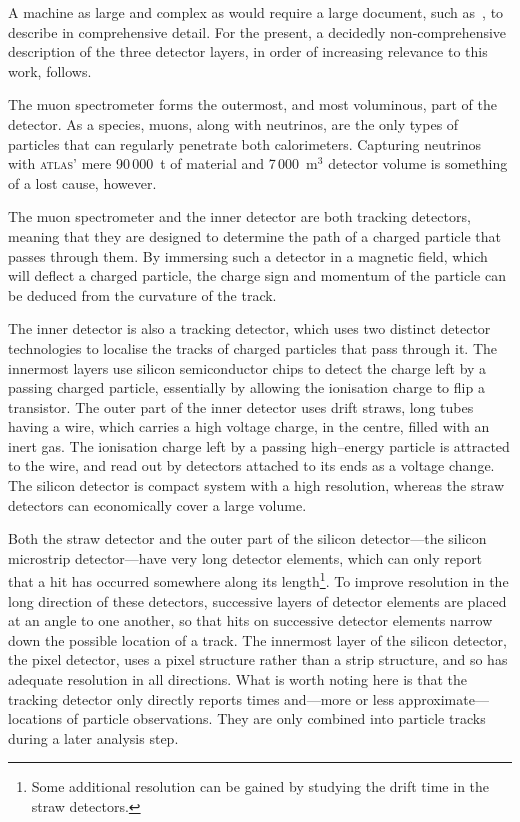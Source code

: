 A machine as large and complex as \atlas{} would require a large document, such as~\cite{detectorpaper}, to describe in comprehensive detail. For the present, a decidedly non-comprehensive description of the three detector layers, in order of increasing relevance to this work, follows.

The muon spectrometer forms the outermost, and most voluminous, part of the detector. As a species, muons, along with neutrinos, are the only types of particles that can regularly penetrate both calorimeters. Capturing neutrinos with \textsc{atlas}' mere 90\,000~t of material and 7\,000~m$^3$ detector volume \cite{atlasweb} is something of a lost cause, however.

The muon spectrometer and the inner detector are both tracking detectors, meaning that they are designed to determine the path of a charged particle that passes through them. By immersing such a detector in a magnetic field, which will deflect a charged particle, the charge sign and momentum of the particle can be deduced from the curvature of the track.

The inner detector is also a tracking detector, which uses two distinct detector technologies to localise the tracks of charged particles that pass through it. The innermost layers use silicon semiconductor chips to detect the charge left by a passing charged particle, essentially by allowing the ionisation charge to flip a transistor. The outer part of the inner detector uses drift straws, long tubes having a wire, which carries a high voltage charge, in the centre, filled with an inert gas. The ionisation charge left by a passing high--energy particle is attracted to the wire, and read out by detectors attached to its ends as a voltage change. The silicon detector is compact system with a high resolution, whereas the straw detectors can economically cover a large volume.

Both the straw detector and the outer part of the silicon detector---the silicon microstrip detector---have very long detector elements, which can only report that a hit has occurred somewhere along its length\footnote{Some additional resolution can be gained by studying the drift time in the straw detectors.}. To improve resolution in the long direction of these detectors, successive layers of detector elements are placed at an angle to one another, so that hits on successive detector elements narrow down the possible location of a track. The innermost layer of the silicon detector, the pixel detector, uses a pixel structure rather than a strip structure, and so has adequate resolution in all directions. What is worth noting here is that the tracking detector only directly reports times and---more or less approximate---locations of particle observations. They are only combined into particle tracks during a later analysis step. 

